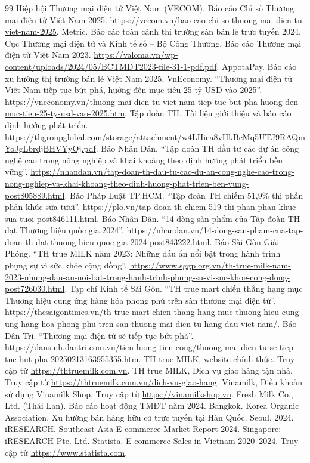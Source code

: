 \begin{thebibliography}{99}
 Hiệp hội Thương mại điện tử Việt Nam (VECOM). Báo cáo Chỉ số Thương mại điện tử Việt Nam 2025. \url{https://vecom.vn/bao-cao-chi-so-thuong-mai-dien-tu-viet-nam-2025}.
 Metric. Báo cáo toàn cảnh thị trường sàn bán lẻ trực tuyến 2024.
 Cục Thương mại điện tử và Kinh tế số -- Bộ Công Thương. Báo cáo Thương mại điện tử Việt Nam 2023. \url{https://valoma.vn/wp-content/uploads/2024/05/BCTMDT2023-file-31-1-pdf.pdf}.
 AppotaPay. Báo cáo xu hướng thị trường bán lẻ Việt Nam 2025.
 VnEconomy. ``Thương mại điện tử Việt Nam tiếp tục bứt phá, hướng đến mục tiêu 25 tỷ USD vào 2025''. \url{https://vneconomy.vn/thuong-mai-dien-tu-viet-nam-tiep-tuc-but-pha-huong-den-muc-tieu-25-ty-usd-vao-2025.htm}.
 Tập đoàn TH. Tài liệu giới thiệu và báo cáo định hướng phát triển. \url{https://thgroupglobal.com/storage/attachment/w4LHiea8vHkBcMq5UTJ9RAQmYoJgLbrdjBHVYyOj.pdf}.
 Báo Nhân Dân. ``Tập đoàn TH đầu tư các dự án công nghệ cao trong nông nghiệp và khai khoáng theo định hướng phát triển bền vững''. \url{https://nhandan.vn/tap-doan-th-dau-tu-cac-du-an-cong-nghe-cao-trong-nong-nghiep-va-khai-khoang-theo-dinh-huong-phat-trien-ben-vung-post805889.html}.
 Báo Pháp Luật TP.HCM. ``Tập đoàn TH chiếm 51,9\% thị phần phân khúc sữa tươi''. \url{https://plo.vn/tap-doan-th-chiem-519-thi-phan-phan-khuc-sua-tuoi-post846111.html}.
 Báo Nhân Dân. ``14 dòng sản phẩm của Tập đoàn TH đạt Thương hiệu quốc gia 2024''. \url{https://nhandan.vn/14-dong-san-pham-cua-tap-doan-th-dat-thuong-hieu-quoc-gia-2024-post843222.html}.
 Báo Sài Gòn Giải Phóng. ``TH true MILK năm 2023: Những dấu ấn nổi bật trong hành trình phụng sự vì sức khỏe cộng đồng''. \url{https://www.sggp.org.vn/th-true-milk-nam-2023-nhung-dau-an-noi-bat-trong-hanh-trinh-phung-su-vi-suc-khoe-cong-dong-post726030.html}.
 Tạp chí Kinh tế Sài Gòn. ``TH true mart chiến thắng hạng mục Thương hiệu cung ứng hàng hóa phong phú trên sàn thương mại điện tử''. \url{https://thesaigontimes.vn/th-true-mart-chien-thang-hang-muc-thuong-hieu-cung-ung-hang-hoa-phong-phu-tren-san-thuong-mai-dien-tu-hang-dau-viet-nam/}.
 Báo Dân Trí. ``Thương mại điện tử sẽ tiếp tục bứt phá''. \url{https://dansinh.dantri.com.vn/tien-luong-tien-cong/thuong-mai-dien-tu-se-tiep-tuc-but-pha-20250213163955355.htm}.
 TH true MILK, website chính thức. Truy cập từ \url{https://thtruemilk.com.vn}.
 TH true MILK, Dịch vụ giao hàng tận nhà. Truy cập từ \url{https://thtruemilk.com.vn/dich-vu-giao-hang}.
 Vinamilk, Điều khoản sử dụng Vinamilk Shop. Truy cập từ \url{https://vinamilkshop.vn}.
 Fresh Milk Co., Ltd. (Thái Lan). Báo cáo hoạt động TMĐT năm 2024. Bangkok.
 Korea Organic Association. Xu hướng bán hàng hữu cơ trực tuyến tại Hàn Quốc. Seoul, 2024.
 iRESEARCH. Southeast Asia E-commerce Market Report 2024. Singapore: iRESEARCH Pte. Ltd.
 Statista. E-commerce Sales in Vietnam 2020--2024. Truy cập từ \url{https://www.statista.com}.
\end{thebibliography}
